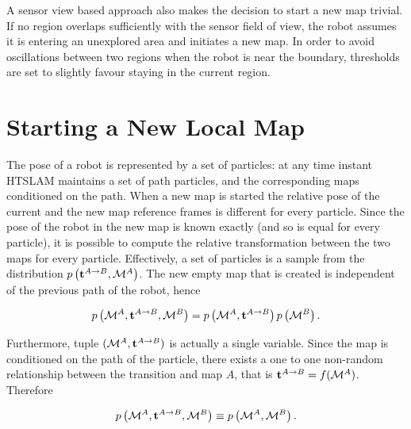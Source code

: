 A sensor view based approach also makes the decision to start a new
map trivial. If no region overlaps sufficiently with the sensor field
of view, the robot assumes it is entering an unexplored area and
initiates a new map. In order to avoid oscillations between two
regions when the robot is near the boundary, thresholds are set to
slightly favour staying in the current region.


\section{Starting a New Local Map}
\label{sec:starting_new_map}


The pose of a robot is represented by a set of particles: at any time
instant HTSLAM maintains a set of path particles, and the
corresponding maps conditioned on the path. When a new map is started
the relative pose of the current and the new map reference frames is
different for every particle. Since the pose of the robot in the new
map is known exactly (and so is equal for every particle), it is
possible to compute the relative transformation between the two maps
for every particle. Effectively, a set of particles is a sample from
the distribution $\prob{\tr{}{A}{B},\mapA}$.  The new empty map that
is created is independent of the previous path of the robot, hence

$$
 \prob{\mapA,\tr{}{A}{B},\mapB} = \prob{\mapA,\tr{}{A}{B}}\prob{\mapB}.
$$

Furthermore, tuple $(\mapA, \tr{}{A}{B})$ is actually a single variable.
Since the map is conditioned on the path of the particle, there exists a
one to one non-random relationship between the transition and map $A$,
that is $\tr{}{A}{B} = f(\mapA)$. Therefore

$$
\prob{\mapA,\tr{}{A}{B},\mapB} \equiv \prob{\mapA,\mapB}.
$$

